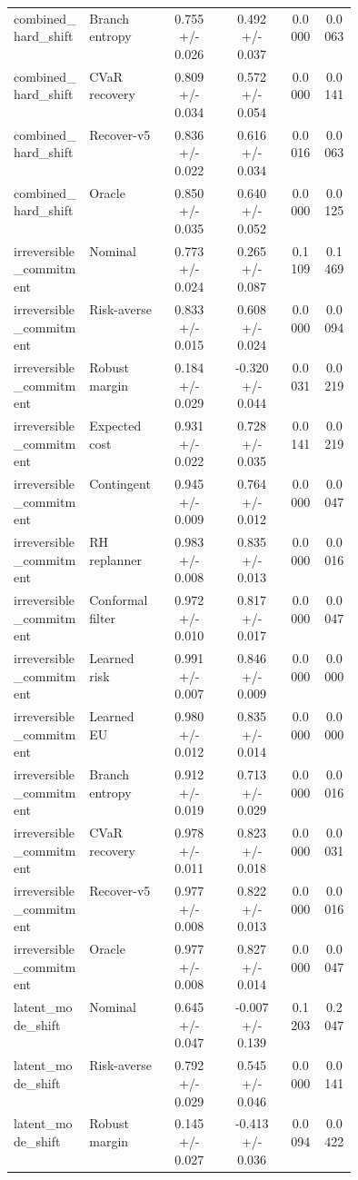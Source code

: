 \documentclass{article}
\begin{document}
\begin{center}
\begin{longtable}{p{0.22\linewidth}p{0.22\linewidth}cccc}
combined\_hard\_shift & Branch entropy & 0.755 +/- 0.026 & 0.492 +/- 0.037 & 0.0000 & 0.0063\\
combined\_hard\_shift & CVaR recovery & 0.809 +/- 0.034 & 0.572 +/- 0.054 & 0.0000 & 0.0141\\
combined\_hard\_shift & Recover-v5 & 0.836 +/- 0.022 & 0.616 +/- 0.034 & 0.0016 & 0.0063\\
combined\_hard\_shift & Oracle & 0.850 +/- 0.035 & 0.640 +/- 0.052 & 0.0000 & 0.0125\\
irreversible\_commitment & Nominal & 0.773 +/- 0.024 & 0.265 +/- 0.087 & 0.1109 & 0.1469\\
irreversible\_commitment & Risk-averse & 0.833 +/- 0.015 & 0.608 +/- 0.024 & 0.0000 & 0.0094\\
irreversible\_commitment & Robust margin & 0.184 +/- 0.029 & -0.320 +/- 0.044 & 0.0031 & 0.0219\\
irreversible\_commitment & Expected cost & 0.931 +/- 0.022 & 0.728 +/- 0.035 & 0.0141 & 0.0219\\
irreversible\_commitment & Contingent & 0.945 +/- 0.009 & 0.764 +/- 0.012 & 0.0000 & 0.0047\\
irreversible\_commitment & RH replanner & 0.983 +/- 0.008 & 0.835 +/- 0.013 & 0.0000 & 0.0016\\
irreversible\_commitment & Conformal filter & 0.972 +/- 0.010 & 0.817 +/- 0.017 & 0.0000 & 0.0047\\
irreversible\_commitment & Learned risk & 0.991 +/- 0.007 & 0.846 +/- 0.009 & 0.0000 & 0.0000\\
irreversible\_commitment & Learned EU & 0.980 +/- 0.012 & 0.835 +/- 0.014 & 0.0000 & 0.0000\\
irreversible\_commitment & Branch entropy & 0.912 +/- 0.019 & 0.713 +/- 0.029 & 0.0000 & 0.0016\\
irreversible\_commitment & CVaR recovery & 0.978 +/- 0.011 & 0.823 +/- 0.018 & 0.0000 & 0.0031\\
irreversible\_commitment & Recover-v5 & 0.977 +/- 0.008 & 0.822 +/- 0.013 & 0.0000 & 0.0016\\
irreversible\_commitment & Oracle & 0.977 +/- 0.008 & 0.827 +/- 0.014 & 0.0000 & 0.0047\\
latent\_mode\_shift & Nominal & 0.645 +/- 0.047 & -0.007 +/- 0.139 & 0.1203 & 0.2047\\
latent\_mode\_shift & Risk-averse & 0.792 +/- 0.029 & 0.545 +/- 0.046 & 0.0000 & 0.0141\\
latent\_mode\_shift & Robust margin & 0.145 +/- 0.027 & -0.413 +/- 0.036 & 0.0094 & 0.0422\\

\end{longtable}
\end{center}
\end{document}
